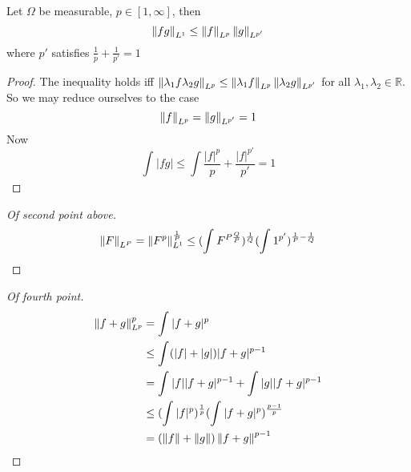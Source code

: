 \documentclass[../main.tex]{subfiles}
\begin{document}
\begin{thm}
Let $\Omega$ be measurable, $ p \in [ 1, \infty ] $, then
\[ 
	\left\lVert fg\right\rVert _{L^{1}} \leq  \left\lVert f\right\rVert_{L^{p}} \left\lVert g\right\rVert_{L^{p'}} 
\]
where $p'$ satisfies $\frac{1}{p}+ \frac{1}{p'}= 1$ 
\end{thm}
\begin{proof}
	The inequality holds iff $ \left\lVert \lambda_1 f \lambda_2 g\right\rVert_{L^{p}} \leq  \left\lVert\lambda_1 f\right\rVert_{L^{p}} \left\lVert \lambda_2 g\right\rVert_{L^{p'}}  $ for all $\lambda_1, \lambda_2\in \mathbb{R}$.\\
	So we may reduce ourselves to the case
	\[ 
	\left\lVert f\right\rVert _{L^{p}} = \left\lVert g\right\rVert _{L^{p'}} =1
	\]
	Now
	\[ 
	\int_{  }^{  }|fg| \leq  \int \frac{|f|^{p}}{p}+ \frac{|f|^{p'}}{p'} = 1 
	\]
	
	
\end{proof}
\begin{proof}[Of second point above]
\begin{align*}
	\left\lVert F\right\rVert_{L^{P}} = \left\lVert F^{p}\right\rVert_{L^{1}} ^{\frac{1}{P}} \leq  ( \int_{  }^{  }F^{P \frac{Q}{P}}) ^{\frac{1}{Q}} ( \int_{  }^{  }1^{p'})^{\frac{1}{P}-\frac{1}{Q} }
\end{align*}

\end{proof}
\begin{proof}[Of fourth point]
\begin{align*}
	\left\lVert f+g\right\rVert _{L^{p}} ^{p}&=  \int_{  }^{  }|f+g| ^{p} \\
	& \leq  \int_{  }^{  } ( |f|+|g|) |f+g|^{p-1}\\
	&= \int_{  }^{  }|f| |f+g|^{p-1}+ \int_{  }^{  } |g| |f+g|^{p-1}\\
	&\leq ( \int_{  }^{  }|f|^{p}) ^{\frac{1}{p}} ( \int_{  }^{  }|f+g|^{p}) ^{ \frac{p-1}{p}}\\
	&= ( \left\lVert f\right\rVert + \left\lVert g\right\rVert ) \left\lVert f+g\right\rVert ^{p-1}	
\end{align*}

\end{proof}
\end{document}
